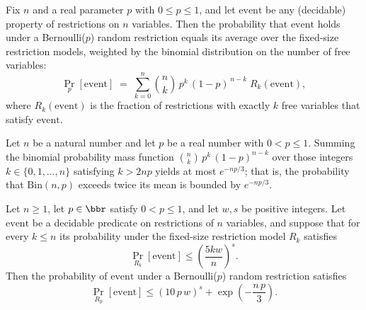 \begin{lemma}
\label{BernoulliCost.bernoulli_decompose}
\leanok
{}
Fix $n$ and a real parameter $p$ with $0 \le p \le 1$, and let $\mathrm{event}$ be any
(decidable) property of restrictions on $n$ variables. Then the probability that
$\mathrm{event}$ holds under a Bernoulli($p$) random restriction equals its average over
the fixed-size restriction models, weighted by the binomial distribution on the number
of free variables:
\[
\Pr_{p}[\mathrm{event}] \;=\; \sum_{k=0}^{n} \binom{n}{k}\, p^{k}\, (1-p)^{\,n-k}\;
R_k(\mathrm{event}),
\]
where $R_k(\mathrm{event})$ is the fraction of restrictions with exactly $k$ free
variables that satisfy $\mathrm{event}$.
\end{lemma}

\begin{lemma}
\label{BernoulliCost.chernoff_binomial_upper_tail}
\leanok
{}
Let $n$ be a natural number and let $p$ be a real number with $0 < p \le 1$. Summing the
binomial probability mass function $\binom{n}{k}\,p^k\,(1-p)^{n-k}$ over those integers
$k \in \{0, 1, \dots, n\}$ satisfying $k > 2np$ yields at most $e^{-np/3}$; that is, the
probability that $\mathrm{Bin}(n,p)$ exceeds twice its mean is bounded by $e^{-np/3}$.
\end{lemma}

\begin{theorem}
\label{BernoulliCost.bernoulli_restriction_cost}
\leanok
{}
Let $n \ge 1$, let $p \in \bbr$ satisfy $0 < p \le 1$, and let $w, s$ be positive
integers. Let $\mathrm{event}$ be a decidable predicate on restrictions of $n$
variables, and suppose that for every $k \le n$ its probability under the fixed-size
restriction model $R_k$ satisfies
\[
  \Pr_{R_k}[\mathrm{event}] \le \left(\frac{5kw}{n}\right)^{s}.
\]
Then the probability of $\mathrm{event}$ under a Bernoulli($p$) random restriction
satisfies
\[
  \Pr_{R_p}[\mathrm{event}] \le (10\,p\,w)^{s} + \exp\!\left(-\frac{n\,p}{3}\right).
\]
\end{theorem}

